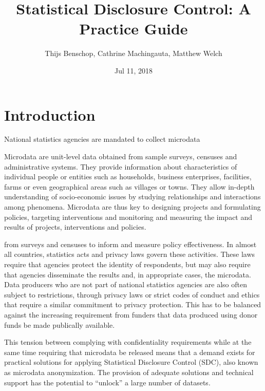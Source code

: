 \documentclass[letterpaper,10pt,english]{sphinxmanual}
\title{Statistical Disclosure Control: A Practice Guide}
\date{Jul 11, 2018}
\author{Thijs Benschop, Cathrine Machingauta, Matthew Welch}
\begin{document}
\maketitle
\sphinxtableofcontents
{}\label{\detokenize{index::doc}}



\chapter{Introduction}
\label{\detokenize{intro::doc}}\label{\detokenize{intro:introduction}}\label{\detokenize{intro:statistical-disclosure-control-for-microdata-a-practice-guide}}
National statistics agencies are mandated to collect
microdata %
\begin{footnote}[1]\sphinxAtStartFootnote
Microdata are unit-level data obtained from sample surveys, censuses
and administrative systems. They provide information about
characteristics of individual people or entities such as households,
business enterprises, facilities, farms or even geographical areas
such as villages or towns. They allow in-depth understanding of
socio-economic issues by studying relationships and interactions
among phenomena. Microdata are thus key to designing projects and
formulating policies, targeting interventions and monitoring and
measuring the impact and results of projects, interventions and
policies.
%
\end{footnote} from surveys and censuses to inform and
measure policy effectiveness. In almost all countries, statistics acts
and privacy laws govern these activities. These laws require that
agencies protect the identity of respondents, but may also require that
agencies disseminate the results and, in appropriate cases, the
microdata. Data producers who are not part of national statistics
agencies are also often subject to restrictions, through privacy laws or
strict codes of conduct and ethics that require a similar commitment to
privacy protection. This has to be balanced against the increasing
requirement from funders that data produced using donor funds be made
publically available.

This tension between complying with confidentiality requirements while
at the same time requiring that microdata be released means that a
demand exists for practical solutions for applying Statistical
Disclosure Control (SDC), also known as microdata anonymization. The
provision of adequate solutions and technical support has the potential
to “unlock” a large number of datasets.
\end{document}
